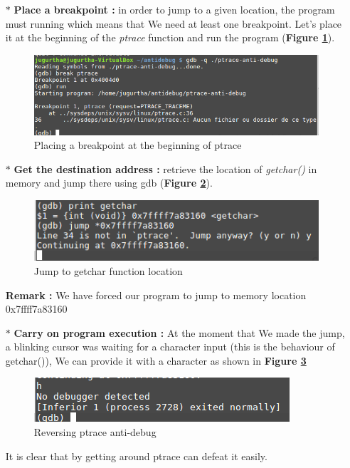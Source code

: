\begin{itemize}
	\item[$\ast$] \textbf{Place a breakpoint :} in order to jump to a given location, the program must running which means that We need at least one breakpoint. Let's place it at the beginning of the \emph{ptrace} function and run the program (\textbf{Figure \ref{Placing a breakpoint at the beginning of ptrace}}).
			\begin{figure}[H]
					\centering
        			\includegraphics[scale=0.5]{img/solution/ptrace-reverse-anti-debug.png}
        			\caption{Placing a breakpoint at the beginning of ptrace}
        			\label{Placing a breakpoint at the beginning of ptrace}
   			 \end{figure}
		
	
	\item[$\ast$] \textbf{Get the destination address : } retrieve the location of \emph{getchar()} in memory and jump there using gdb (\textbf{Figure \ref{Jump to getchar function location}}).
	\begin{figure}[H]
					\centering
        			\includegraphics[scale=0.5]{img/solution/jumpMadeUsingGDB.png}
        			\caption{Jump to getchar function location}
        			\label{Jump to getchar function location}
   			 \end{figure}
\textbf{\color{orange}Remark :} We have forced our program to jump to memory location 0x7ffff7a83160	
	\item[$\ast$] \textbf{Carry on program execution : } At the moment that We made the jump, a blinking cursor was waiting for a character input (this is the behaviour of getchar()), We can provide it with a character as shown in \textbf{Figure \ref{Reversing ptrace anti-debug}}
			\begin{figure}[H]
					\centering
        			\includegraphics[scale=0.45]{img/solution/reverse-engineering-debugged.png}
        			\caption{Reversing ptrace anti-debug}
        			\label{Reversing ptrace anti-debug}
   			 \end{figure}
	It is clear that by getting around ptrace can defeat it easily.
	
\end{itemize}





